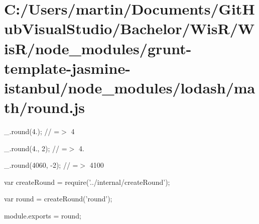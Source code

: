 \hypertarget{_c_1_2_users_2martin_2_documents_2_git_hub_visual_studio_2_bachelor_2_wis_r_2_wis_r_2node_moduleda8e8958b61b7f4e97461dc6fd21700d}{}\section{C\+:/\+Users/martin/\+Documents/\+Git\+Hub\+Visual\+Studio/\+Bachelor/\+Wis\+R/\+Wis\+R/node\+\_\+modules/grunt-\/template-\/jasmine-\/istanbul/node\+\_\+modules/lodash/math/round.\+js}
\+\_\+.\+round(4.); // =$>$ 4

\+\_\+.\+round(4., 2); // =$>$ 4.

\+\_\+.\+round(4060, -\/2); // =$>$ 4100


\begin{DoxyCodeInclude}
var createRound = require(\textcolor{stringliteral}{'../internal/createRound'});

var round = createRound(\textcolor{stringliteral}{'round'});

module.exports = round;
\end{DoxyCodeInclude}
 